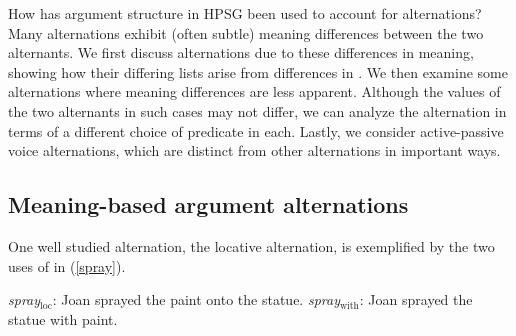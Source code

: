 \documentclass[output=paper
                ,modfonts
                ,nonflat
	        ,collection
	        ,collectionchapter
	        ,collectiontoclongg
 	        ,biblatex
                ,babelshorthands
                ,newtxmath
                ,draftmode
                ,colorlinks, citecolor=brown
]{./langsci/langscibook}
\begin{document}
How has argument structure in HPSG been used to account for alternations?
Many alternations exhibit (often subtle) meaning differences between the two 
alternants.
We first discuss alternations due to these differences in meaning, showing how their differing \argst lists arise from differences in .  
We then examine some alternations where meaning differences are less apparent.
Although the  values of the two alternants in such cases may not differ, we can analyze the alternation in terms of a different choice of  predicate in each.
Lastly, we consider active-passive voice alternations, which are distinct from other alternations in important ways.

\subsection{Meaning-based argument alternations}

One well studied alternation, the locative alternation, is exemplified by the two uses of  in (\ref{spray}).

\begin{exe}
\ex \label{spray}
\begin{xlist}
\ex \label{spraya} \textit{spray$_{\text{loc}}$}: Joan sprayed the paint onto the statue.
\ex \label{sprayb} \textit{spray$_{\text{with}}$}: Joan sprayed the statue with paint.
 \end{xlist}
 \end{exe}
\end{document}
